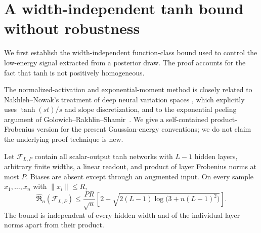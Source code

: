\section{A width-independent tanh bound without robustness}
\label{sec:productnorm}

We first establish the width-independent function-class bound used to
control the low-energy signal extracted from a posterior draw. The proof
accounts for the fact that tanh is not positively homogeneous.

The normalized-activation and exponential-moment method is closely related
to Nakhleh--Nowak's treatment of deep neural variation spaces
\cite{nakhleh2026}, which explicitly uses $\tanh(st)/s$ and slope
discretization, and to the exponential peeling argument of
Golowich--Rakhlin--Shamir~\cite{golowich2018}. We give a self-contained
product-Frobenius version for the present Gaussian-energy conventions;
we do not claim the underlying proof technique is new.

\begin{theorem}\label{thm:tanh-product}
Let $\mathcal F_{L,P}$ contain all scalar-output tanh networks with $L-1$
hidden layers, arbitrary finite widths, a linear readout, and product of
layer Frobenius norms at most $P$. Biases are absent except through an
augmented input. On every sample $x_1,\ldots,x_n$ with $\|x_i\|\le R$,
\[
 \widehat{\mathfrak R}_n(\mathcal F_{L,P})
 \le \frac{PR}{\sqrt n}
 \left[2+\sqrt{2(L-1)\log\bigl(3+n(L-1)^2\bigr)}\right].
\]
The bound is independent of every hidden width and of the individual layer
norms apart from their product.
\end{theorem}

